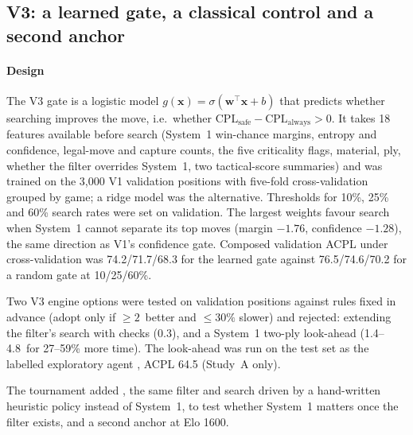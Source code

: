 \subsection{V3: a learned gate, a classical control and a second anchor}
\paragraph*{Design}
The V3 gate is a logistic model $g(\mathbf{x})=\sigma(\mathbf{w}^{\top}\mathbf{x}+b)$ that predicts whether searching improves the move, i.e.\ whether $\mathrm{CPL}_{\text{safe}}-\mathrm{CPL}_{\text{always}}>0$. It takes 18 features available before search (System~1 win-chance margins, entropy and confidence, legal-move and capture counts, the five criticality flags, material, ply, whether the filter overrides System~1, two tactical-score summaries) and was trained on the 3{,}000 V1 validation positions with five-fold cross-validation grouped by game; a ridge model was the alternative. Thresholds for 10\%, 25\% and 60\% search rates were set on validation. The largest weights favour search when System~1 cannot separate its top moves (margin $-1.76$, confidence $-1.28$), the same direction as V1's confidence gate. Composed validation ACPL under cross-validation was 74.2/71.7/68.3 for the learned gate against 76.5/74.6/70.2 for a random gate at 10/25/60\%.

Two V3 engine options were tested on validation positions against rules fixed in advance (adopt only if $\ge2$\cp\ better and $\le30\%$ slower) and rejected: extending the filter's search with checks (0.3\cp), and a System~1 two-ply look-ahead (1.4--4.8\cp\ for 27--59\% more time). The look-ahead was run on the test set as the labelled exploratory agent , ACPL 64.5 (Study~A only).

The tournament added , the same filter and search driven by a hand-written heuristic policy instead of System~1, to test whether System~1 matters once the filter exists, and a second anchor at Elo 1600.

